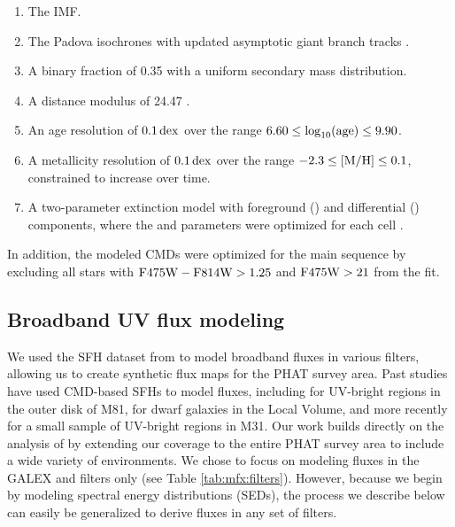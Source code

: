 \documentclass[iop, tighten]{emulateapj}
\begin{document}
\begin{enumerate}
\item The \citet{Kroupa:2001} IMF.
\item The Padova isochrones \citep{Marigo:2008} with updated asymptotic giant
    branch tracks \citep{Girardi:2010}.
\item A binary fraction of 0.35 with a uniform secondary mass distribution.
\item A distance modulus of 24.47 \citep{McConnachie:2005}.
\item An age resolution of $0.1\,\mathrm{dex}$ over the range $6.60 \le
    \log_{10}(\mathrm{age}) \le 9.90$.
\item A metallicity resolution of $0.1\,\mathrm{dex}$ over the range $-2.3 \le \mathrm{[M/H]} \le
    0.1$, constrained to increase over time.
\item A two-parameter extinction model with foreground (\avf{}) and
    differential (\dav{}) components, where the \avf{} and \dav{} parameters
    were optimized for each cell \citep[see also][]{Simones:2014}.
\end{enumerate}

In addition, the modeled CMDs were optimized for the main sequence by excluding
all stars with $\mathrm{F475W} - \mathrm{F814W} > 1.25$ and $\mathrm{F475W} > 21$ from the fit.



\subsection{Broadband UV flux modeling}\label{mfx:syntheticfluxmaps:fluxmod}

We used the SFH dataset from \citet{Lewis:2014} to model broadband fluxes in
various filters, allowing us to create synthetic flux maps for the PHAT survey
area. Past studies have used CMD-based SFHs to model fluxes, including
\citet{Gogarten:2009} for UV-bright regions in the outer disk of M81,
\citet{Johnson:2013} for dwarf galaxies in the Local Volume, and more recently
\citet{Simones:2014} for a small sample of UV-bright regions in M31. Our work
builds directly on the analysis of \citet{Simones:2014} by extending our
coverage to the entire PHAT survey area to include a wide variety of
environments. We chose to focus on modeling fluxes in the GALEX \fuv{} and
\nuv{} filters only (see Table \ref{tab:mfx:filters}). However, because we
begin by modeling spectral energy distributions (SEDs), the process we describe
below can easily be generalized to derive fluxes in any set of filters.
\end{document}
